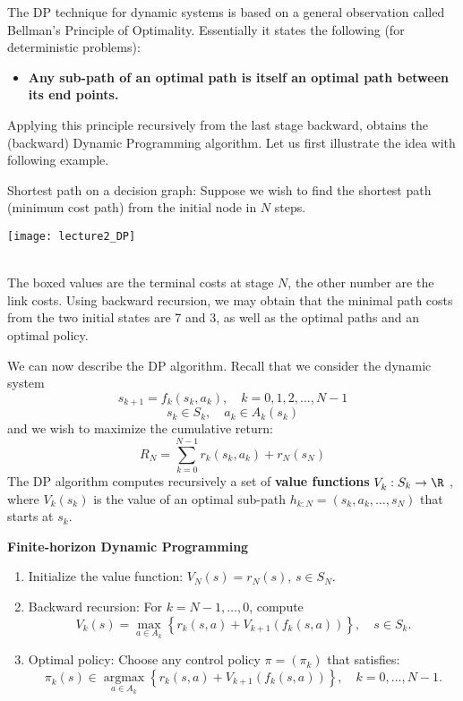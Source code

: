 The DP technique for dynamic systems is based on a general observation called Bellman's Principle of Optimality. Essentially it states the following (for deterministic problems):
\begin{itemize}
  \item \textbf{Any sub-path of an optimal path is itself an optimal path between its end points.}
\end{itemize}

Applying this principle recursively from the last stage backward, obtains the (backward) Dynamic Programming algorithm. Let us first illustrate the idea with following example.

\begin{example} Shortest path on a decision graph:  Suppose we wish to find the shortest path (minimum cost path) from the initial node in $N$ steps.

\begin{centering}
\texttt{[image: lecture2\_DP]}
\end{centering}
\\
The boxed values are the terminal costs at stage $N$, the other number are the link costs.
Using backward recursion, we may obtain that the minimal path costs from the two initial states are 7 and 3, as well as the optimal paths and an optimal policy.

\end{example}

We can now describe the DP algorithm. Recall that we consider the dynamic system
$${s_{k + 1}} = {f_k}({s_k},{a_k}),\quad k = 0,1,2, \ldots ,N - 1$$
$${s_k} \in {S_k},\quad {a_k} \in {A_k}({s_k})$$
and we wish to maximize the cumulative return:
$${R_N} = \sum\limits_{k = 0}^{N - 1} {{r_k}({s_k},{a_k}) + {r_N}({s_N})} $$
The DP algorithm computes recursively a set of \textbf{value functions} $V_k^{}:{S_k} \to \R$ , where $V_k^{}({s_k})$ is the value of an optimal sub-path ${h_{k:N}} = ({s_k},{a_k}, \ldots ,{s_N})$ that starts at ${s_k}$.

\begin{algorithm_}
\textbf{Finite-horizon Dynamic Programming}
\begin{enumerate}
  \item Initialize the value function:   $V_N^{}(s) = {r_N}(s)$,  $s \in {S_N}$.
  \item Backward recursion:  For $k = N - 1, \ldots ,0$, compute
\[V_k^{}(s) = \mathop {\max }\limits_{a \in {A_k}} \left\{ {{r_k}(s,a) + V_{k + 1}^{}({f_k}(s,a))} \right\},\quad     s \in {S_k}.\]
  \item Optimal policy: Choose any control policy $\pi  = ({\pi _k})$ that satisfies:
\[\pi _k^{}(s) \in \mathop {\arg \max }\limits_{a \in {A_k}} \left\{ {{r_k}(s,a) + V_{k + 1}^{}({f_k}(s,a))} \right\},\quad      k = 0, \ldots ,N - 1.\]
\end{enumerate}
\end{algorithm_}

